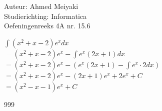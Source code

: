 \documentclass[a4paper]{article}
\begin{document}
  
\noindent \large Auteur: Ahmed Meiyaki \\
\noindent \large Studierichting: Informatica\\
\noindent \large Oefeningenreeks 4A nr. 15.6\\

\medskip

\normalsize

$\displaystyle\int \left(x^2 + x - 2\right)e^x dx $\\

$=\left(x^2 + x - 2\right)e^x - \displaystyle\int e^x \left(2x + 1\right) dx $\\

$=\left(x^2 + x - 2\right)e^x - \left(e^x \left(2x + 1\right) - \displaystyle\int e^x \cdot 2 dx\right) $\\

$=\left(x^2 + x - 2\right)e^x - \left(2x + 1\right)e^x + 2e^x + C $\\

$= \left(x^2 - x - 1\right)e^x + C $\\

\begin{thebibliography}{999}
\end{thebibliography}
\end{document}
